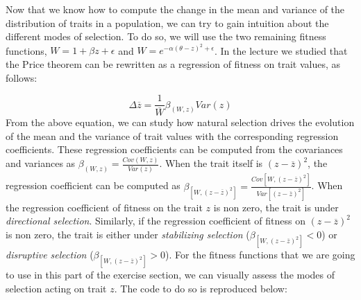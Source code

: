 \documentclass[
]{book}
\begin{document}
Now that we know how to compute the change in the mean and variance of the distribution of traits in a population, we can try to gain intuition about the different modes of selection. To do so, we will use the two remaining fitness functions, \(W=1+\beta z +\epsilon\) and \(W=e^{-\alpha\left(\theta-z\right)^2+\epsilon}\). In the lecture we studied that the Price theorem can be rewritten as a regression of fitness on trait values, as follows:

\[
\Delta \overline{z}=\frac{1}{\overline{W}}\beta_{(W,z)} Var(z)
\] From the above equation, we can study how natural selection drives the evolution of the mean and the variance of trait values with the corresponding regression coefficients. These regression coefficients can be computed from the covariances and variances as \(\beta_{(W,z)}=\frac{Cov(W,z)}{Var(z)}\). When the trait itself is \((z-\overline{z})^2\), the regression coefficient can be computed as \(\beta_{\left[W,(z-\overline{z})^2\right]}=\frac{Cov\left[W,(z-\overline{z})^2\right]}{Var\left[(z-\overline{z})^2\right]}\). When the regression coefficient of fitness on the trait \(z\) is non zero, the trait is under \emph{directional selection}. Similarly, if the regression coefficient of fitness on \((z-\overline{z})^2\) is non zero, the trait is either under \emph{stabilizing selection} (\(\beta_{\left[W,(z-\overline{z})^2\right]}<0\)) or \emph{disruptive selection} (\(\beta_{\left[W,(z-\overline{z})^2\right]}>0\)). For the fitness functions that we are going to use in this part of the exercise section, we can visually assess the modes of selection acting on trait \(z\). The code to do so is reproduced below:
\end{document}
